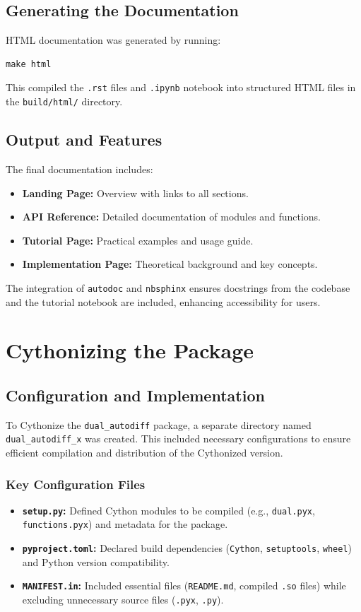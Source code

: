 \documentclass[a4paper,12pt]{article}
\begin{document}
\subsection{Generating the Documentation}
HTML documentation was generated by running:
\begin{verbatim}
make html
\end{verbatim}
This compiled the \texttt{.rst} files and \texttt{.ipynb} notebook into structured HTML files in the \texttt{build/html/} directory.

\subsection{Output and Features}
The final documentation includes:
\begin{itemize}
    \item \textbf{Landing Page:} Overview with links to all sections.
    \item \textbf{API Reference:} Detailed documentation of modules and functions.
    \item \textbf{Tutorial Page:} Practical examples and usage guide.
    \item \textbf{Implementation Page:} Theoretical background and key concepts.
\end{itemize}
The integration of \texttt{autodoc} and \texttt{nbsphinx} ensures docstrings from the codebase and the tutorial notebook are included, enhancing accessibility for users.


\section{Cythonizing the Package}

\subsection{Configuration and Implementation}
To Cythonize the \texttt{dual\_autodiff} package, a separate directory named \texttt{dual\_autodiff\_x} was created. This included necessary configurations to ensure efficient compilation and distribution of the Cythonized version.

\subsubsection{Key Configuration Files}
\begin{itemize}
    \item \textbf{\texttt{setup.py}:} Defined Cython modules to be compiled (e.g., \texttt{dual.pyx}, \texttt{functions.pyx}) and metadata for the package.
    \item \textbf{\texttt{pyproject.toml}:} Declared build dependencies (\texttt{Cython}, \texttt{setuptools}, \texttt{wheel}) and Python version compatibility.
    \item \textbf{\texttt{MANIFEST.in}:} Included essential files (\texttt{README.md}, compiled \texttt{.so} files) while excluding unnecessary source files (\texttt{.pyx}, \texttt{.py}).
\end{itemize}
\end{document}
